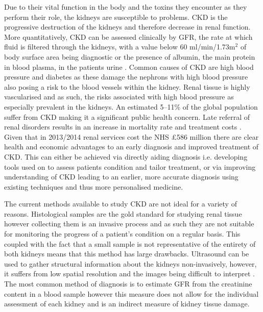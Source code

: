 Due to their vital function in the body and the toxins they encounter as they perform their role, the kidneys are susceptible to problems. \ac{CKD} is the progressive destruction of the kidneys and therefore decrease in renal function. More quantitatively, \ac{CKD} can be assessed clinically by \ac{GFR}, the rate at which fluid is filtered through the kidneys, with a value below 60 ml/min/1.73m$^2$ of body surface area being diagnostic or the presence of albumin, the main protein in blood plasma, in the patients urine \cite{stevens_assessing_2006, farrugia_albumin_2010, pruijm_blood_2017}. Common causes of \ac{CKD} are high blood pressure and diabetes as these damage the nephrons with high blood pressure also posing a risk to the blood vessels within the kidney. Renal tissue is highly vascularised and as such, the risks associated with high blood pressure as especially prevalent in the kidneys. An estimated 5–11\% of the global population suffer from \ac{CKD} \cite{coresh_prevalence_2003, de_lusignan_identifying_2005, drey_population-based_2003, amato_prevalence_2005, chadban_prevalence_2003} making it a significant public health concern. Late referral of renal disorders results in an increase in mortality rate and treatment costs \cite{jungers_late_1993, sesso_late_1996, klebe_cost_2007}. Given that in 2013/2014 renal services cost the \ac{NHS} \pounds 586 million \cite{precious_nhs_2015} there are clear health and economic advantages to an early diagnosis and improved treatment of \ac{CKD}. This can either be achieved via directly aiding diagnosis i.e. developing tools used on to assess patients condition and tailor treatment, or via improving understanding of \ac{CKD} leading to an earlier, more accurate diagnosis using existing techniques and thus more personalised medicine.

The current methods available to study \ac{CKD} are not ideal for a variety of reasons. Histological samples are the gold standard for studying renal tissue however collecting them is an invasive process and as such they are not suitable for monitoring the progress of a patient's condition on a regular basis. This coupled with the fact that a small sample is not representative of the entirety of both kidneys means that this method  has large drawbacks. Ultrasound can be used to gather structural information about the kidneys non-invasively, however, it suffers from low spatial resolution and the images being difficult to interpret \cite{hansen_ultrasonography_2015}. The most common method of diagnosis is to estimate \ac{GFR} from the creatinine content in a blood sample however this measure does not allow for the individual assessment of each kidney and is an indirect measure of kidney tissue damage.

